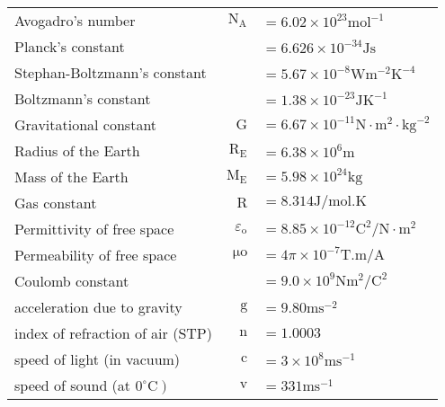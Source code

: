 \documentclass{extarticle}
\begin{document}
\begin{tabularx}{\textwidth}{Xr@{}l}
Avogadro's number & $\mathrm{N}_{\mathrm{A}}$ & $=6.02 \times 10^{23} \mathrm{mol}^{-1}$ \\

Planck's constant & & $=6.626 \times 10^{-34} \mathrm{J} \mathrm{s}$ \\

Stephan-Boltzmann's constant & & $=5.67 \times 10^{-8} \mathrm{W} \mathrm{m}^{-2} \mathrm{K}^{-4}$ \\

Boltzmann's constant & & $=1.38 \times 10^{-23} \mathrm{J} \mathrm{K}^{-1}$ \\



Gravitational constant & $\mathrm{G}$ & $=6.67 \times 10^{-11} \mathrm{N} \cdot \mathrm{m}^{2} \cdot \mathrm{kg}^{-2}$ \\
Radius of the Earth & $\mathrm{R}_{\mathrm{E}}$ & $=6.38 \times 10^{6} \mathrm{m}$ \\

Mass of the Earth & $\mathrm{M}_{\mathrm{E}}$ & $=5.98 \times 10^{24} \mathrm{kg}$ \\

Gas constant & $\mathrm{R}$ & $=8.314 \mathrm{J} / \mathrm{mol} . \mathrm{K}$ \\

Permittivity of free space & $\varepsilon_{\mathrm{o}}$ & $=8.85 \times 10^{-12} \mathrm{C}^{2} / \mathrm{N} \cdot \mathrm{m}^{2}$ \\

Permeability of free space & $\mathrm{\mu o}$ & $=4 \pi \times 10^{-7} \mathrm{T} . \mathrm{m} / \mathrm{A}$ \\

Coulomb constant & & $=9.0 \times 10^{9} \mathrm{N} \mathrm{m}^{2} / \mathrm{C}^{2}$ \\

acceleration due to gravity & $\mathrm{g}$ & $=9.80 \mathrm{m} \mathrm{s}^{-2}$ \\



index of refraction of air (STP) & $\mathrm{n}$ & $=1.0003$ \\

speed of light (in vacuum) & $\mathrm{c}$ & $=3 \times 10^{8} \mathrm{ms}^{-1}$ \\

speed of sound (at $\left.0^{\circ} \mathrm{C}\right)$ & $\mathrm{v}$ & $=331 \mathrm{ms}^{-1}$ \\


\end{tabularx}
\end{document}
